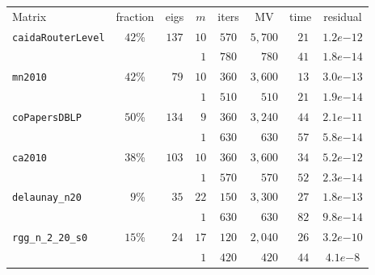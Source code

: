 \begin{tabular}{l|c|c|c|c|c|c|c}
\hline
\multirow{2}{*}{Matrix} & \multirow{2}{*}{fraction} & \multirow{2}{*}{eigs} & \multirow{2}{*}{$m$} & \multirow{2}{*}{iters} & \multirow{2}{*}{MV} & \multirow{2}{*}{time} & \multirow{2}{*}{residual} \\
 & & & & & & & \\\hline
\hline
\multirow{2}{*}{\texttt{caidaRouterLevel}} & \multirow{2}{*}{$42$\%} & \multirow{2}{*}{$137$} & $10$ & $570$ & $5,700$ & $\phantom{0}21$ & $1.2e{-12}$ \\
 & & & $\phantom{0}1$ & $780$ & $\phantom{0,{}}780$ & $\phantom{0}41$ & $1.8e{-14}$ \\\hline
\multirow{2}{*}{\texttt{mn2010}} & \multirow{2}{*}{$42$\%} & \multirow{2}{*}{$\phantom{0}79$} & $10$ & $360$ & $3,600$ & $\phantom{0}13$ & $3.0e{-13}$ \\
 & & & $\phantom{0}1$ & $510$ & $\phantom{0,{}}510$ & $\phantom{0}21$ & $1.9e{-14}$ \\\hline
\multirow{2}{*}{\texttt{coPapersDBLP}} & \multirow{2}{*}{$50$\%} & \multirow{2}{*}{$134$} & $\phantom{0}9$ & $360$ & $3,240$ & $\phantom{0}44$ & $2.1e{-11}$ \\
 & & & $\phantom{0}1$ & $630$ & $\phantom{0,{}}630$ & $\phantom{0}57$ & $5.8e{-14}$ \\\hline
\multirow{2}{*}{\texttt{ca2010}} & \multirow{2}{*}{$38$\%} & \multirow{2}{*}{$103$} & $10$ & $360$ & $3,600$ & $\phantom{0}34$ & $5.2e{-12}$ \\
 & & & $\phantom{0}1$ & $570$ & $\phantom{0,{}}570$ & $\phantom{0}52$ & $2.3e{-14}$ \\\hline
\multirow{2}{*}{\texttt{delaunay\_n20}} & \multirow{2}{*}{$\phantom{0}9$\%} & \multirow{2}{*}{$\phantom{0}35$} & $22$ & $150$ & $3,300$ & $\phantom{0}27$ & $1.8e{-13}$ \\
 & & & $\phantom{0}1$ & $630$ & $\phantom{0,{}}630$ & $\phantom{0}82$ & $9.8e{-14}$ \\\hline
\multirow{2}{*}{\texttt{rgg\_n\_2\_20\_s0}} & \multirow{2}{*}{$15$\%} & \multirow{2}{*}{$\phantom{0}24$} & $17$ & $120$ & $2,040$ & $\phantom{0}26$ & $3.2e{-10}$ \\
 & & & $\phantom{0}1$ & $420$ & $\phantom{0,{}}420$ & $\phantom{0}44$ & $4.1e{-8}$ \\\hline
\end{tabular}